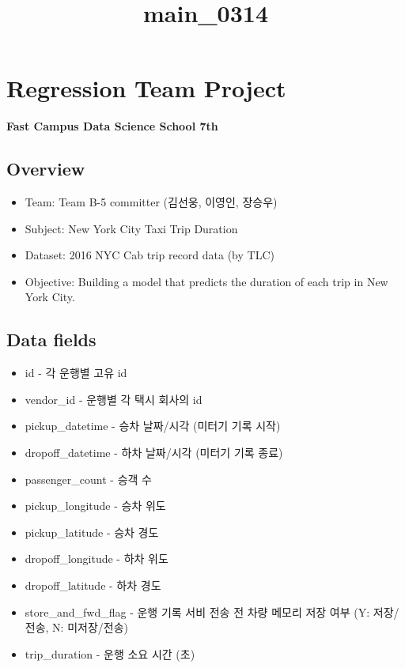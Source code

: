 \documentclass[11pt]{article}
\title{main\_0314}
\providecommand{\tightlist}{%
      \setlength{\itemsep}{0pt}\setlength{\parskip}{0pt}}
\begin{document}
    
    
    \maketitle
    
    

    
    \hypertarget{regression-team-project}{%
\section{Regression Team Project}\label{regression-team-project}}

\textbf{Fast Campus Data Science School 7th}

\hypertarget{overview}{%
\subsection{Overview}\label{overview}}

\begin{itemize}
\tightlist
\item
  Team: Team B-5 committer (김선웅, 이영인, 장승우)
\item
  Subject: New York City Taxi Trip Duration
\item
  Dataset: 2016 NYC Cab trip record data (by TLC)
\item
  Objective: Building a model that predicts the duration of each trip in
  New York City.
\end{itemize}

\hypertarget{data-fields}{%
\subsection{Data fields}\label{data-fields}}

\begin{itemize}
\tightlist
\item
  id - 각 운행별 고유 id
\item
  vendor\_id - 운행별 각 택시 회사의 id
\item
  pickup\_datetime - 승차 날짜/시각 (미터기 기록 시작)
\item
  dropoff\_datetime - 하차 날짜/시각 (미터기 기록 종료)
\item
  passenger\_count - 승객 수
\item
  pickup\_longitude - 승차 위도
\item
  pickup\_latitude - 승차 경도
\item
  dropoff\_longitude - 하차 위도
\item
  dropoff\_latitude - 하차 경도
\item
  store\_and\_fwd\_flag - 운행 기록 서비 전송 전 차량 메모리 저장 여부
  (Y: 저장/전송, N: 미저장/전송)
\item
  trip\_duration - 운행 소요 시간 (초)
\end{itemize}
\end{document}
